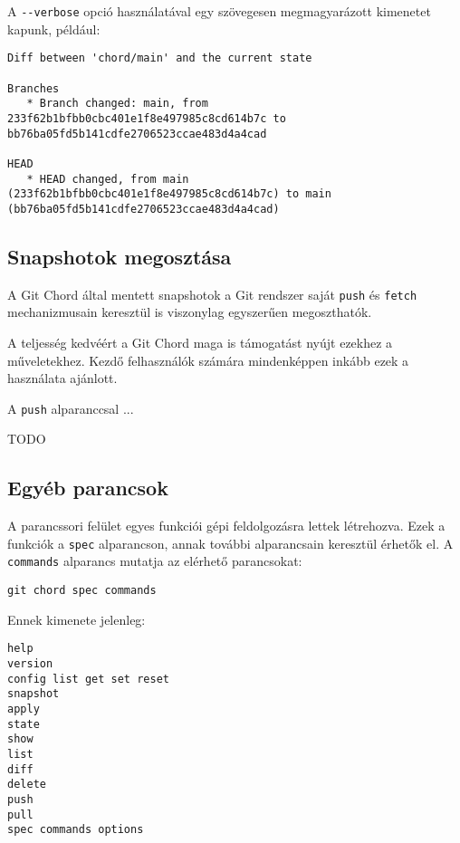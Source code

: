 \documentclass[final]{elteikthesis}[2025/03/25]
\begin{document}
A \verb|--verbose| opció használatával egy szövegesen megmagyarázott kimenetet kapunk, például:

\begin{verbatim}
Diff between 'chord/main' and the current state

Branches
   * Branch changed: main, from 233f62b1bfbb0cbc401e1f8e497985c8cd614b7c to bb76ba05fd5b141cdfe2706523ccae483d4a4cad

HEAD
   * HEAD changed, from main (233f62b1bfbb0cbc401e1f8e497985c8cd614b7c) to main (bb76ba05fd5b141cdfe2706523ccae483d4a4cad)
\end{verbatim}

\subsection{Snapshotok megosztása}

A Git Chord által mentett snapshotok a Git rendszer saját \verb|push| és \verb|fetch|
mechanizmusain keresztül is viszonylag egyszerűen megoszthatók.

A teljesség kedvéért a Git Chord maga is támogatást nyújt ezekhez a műveletekhez.
Kezdő felhasználók számára mindenképpen inkább ezek a használata ajánlott.

A \verb|push| alparanccsal ...

TODO


\subsection{Egyéb parancsok}

A parancssori felület egyes funkciói gépi feldolgozásra lettek létrehozva.
Ezek a funkciók a \verb|spec| alparancson, annak további alparancsain keresztül érhetők el.
A \verb|commands| alparancs mutatja az elérhető parancsokat:

\begin{verbatim}
git chord spec commands
\end{verbatim}

Ennek kimenete jelenleg:

\begin{verbatim}
help
version
config list get set reset
snapshot
apply
state
show
list
diff
delete
push
pull
spec commands options
\end{verbatim}
\end{document}
